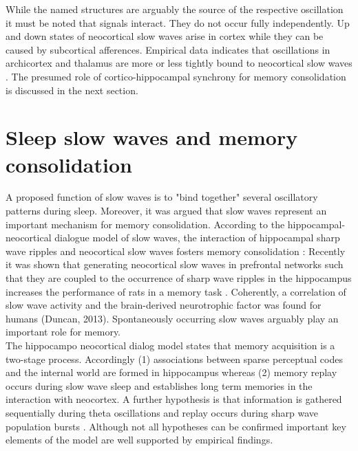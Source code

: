 While the named structures are arguably the source of the respective oscillation it must be noted that signals interact. They do not occur fully independently. Up and down states of neocortical slow waves arise in cortex while they can be caused by subcortical afferences. Empirical data indicates that oscillations in archicortex and thalamus are more or less tightly bound to neocortical slow waves \parencite{niethard2018cortical}. The presumed role of cortico-hippocampal synchrony for memory consolidation is discussed in the next section.\\
\section{Sleep slow waves and memory consolidation}
\label{slow_waves_and_memory}
A proposed function of slow waves is to "bind together" \parencite[1110]{brown2012control} several oscillatory patterns during sleep. Moreover, it was argued that slow waves represent an important mechanism for memory consolidation. According to the hippocampal-neocortical dialogue model of slow waves, the interaction of hippocampal sharp wave ripples and neocortical slow waves fosters memory consolidation \parencite{buzsaki1996hippocampo}: Recently it was shown that generating neocortical slow waves in prefrontal networks such that they are coupled to the occurrence of sharp  wave ripples in the hippocampus increases the performance of rats in a memory task \parencite{maingret2016hippocampo}. Coherently, a correlation of slow wave activity and the brain-derived neurotrophic factor was found for humans (Duncan, 2013). Spontaneously occurring slow waves arguably play an important role for memory.\\
The hippocampo neocortical dialog model states that memory acquisition is a two-stage process. Accordingly (1) associations between sparse perceptual codes and the internal world are formed in hippocampus whereas (2) memory replay occurs during slow wave sleep and establishes long term memories in the interaction with neocortex. A further hypothesis is that information is gathered sequentially during theta oscillations and replay occurs during sharp wave population bursts \parencite{buzsaki1996hippocampo}. Although not all hypotheses can be confirmed important key elements of the model are well supported by empirical findings.\\
